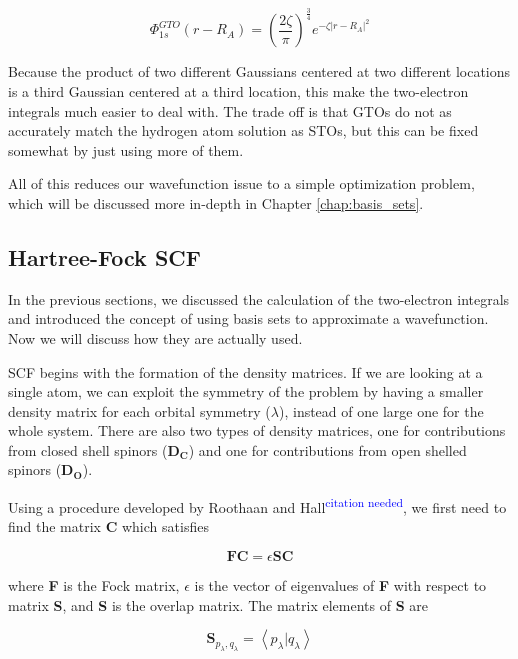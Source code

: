 \documentclass[12pt]{report}
\newcommand{\citethis}{\textsuperscript{\textcolor{blue}{citation needed}}} %
\begin{document}
\begin{equation}
\label{eq:gto_1s}
\Phi^{GTO}_{1s}(r - R_{A}) = \left(\frac{2\zeta}{\pi}\right)^{\frac{3}{4}}e^{-\zeta|r- R_{A}|^{2}}
\end{equation}

Because the product of two different Gaussians centered at two different locations is a third Gaussian centered at a third location, this make the two-electron integrals much easier to deal with. The trade off is that GTOs do not as accurately match the hydrogen atom solution as STOs, but this can be fixed somewhat by just using more of them.

All of this reduces our wavefunction issue to a simple optimization problem, which will be discussed more in-depth in Chapter \ref{chap:basis_sets}.

\subsection{Hartree-Fock SCF}
In the previous sections, we discussed the calculation of the two-electron integrals and introduced the concept of using basis sets to approximate a wavefunction. Now we will discuss how they are actually used. 

SCF begins with the formation of the density matrices. If we are looking at a single atom, we can exploit the symmetry of the problem by having a smaller density matrix for each orbital symmetry ($\lambda$), instead of one large one for the whole system. There are also two types of density matrices, one for contributions from closed shell spinors (\textbf{D$_\textbf{C}$}) and one for contributions from open shelled spinors (\textbf{D$_\textbf{O}$}).

Using a procedure developed by Roothaan and Hall\citethis{}, we first need to find the matrix \textbf{C} which satisfies 

\begin{equation}
\label{RHE}
\textbf{FC} = \epsilon{}\textbf{SC}
\end{equation}

where \textbf{F} is the Fock matrix, $\epsilon$ is the vector of eigenvalues of \textbf{F} with respect to matrix \textbf{S}, and \textbf{S} is the overlap matrix. The matrix elements of \textbf{S} are

\begin{equation}
\label{eq:smat}
\textbf{S}_{p_{\lambda}, q_{\lambda}} = \left<p_{\lambda}|q_{\lambda}\right>
\end{equation}
\end{document}
